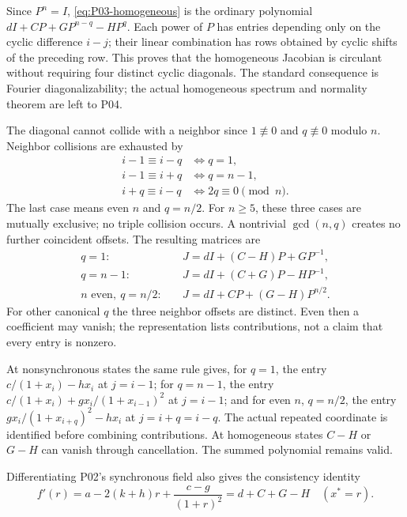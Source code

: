 \documentclass[11pt]{article}
\theoremstyle{definition}
\theoremstyle{remark}
\begin{document}
Since $P^n=I$, \eqref{eq:P03-homogeneous} is the ordinary polynomial
$dI+CP+GP^{n-q}-HP^q$. Each power of $P$ has entries depending
only on the cyclic difference $i-j$; their linear combination has
rows obtained by cyclic shifts of the preceding row. This proves
that the homogeneous Jacobian is circulant without requiring four
distinct cyclic diagonals. The standard consequence is Fourier
 diagonalizability; the actual homogeneous spectrum and normality
 theorem are left to P04.

The diagonal cannot collide with a neighbor since $1\not\equiv0$
and $q\not\equiv0$ modulo $n$. Neighbor collisions are exhausted by
\[
\begin{aligned}
 i-1\equiv i-q&\iff q=1,\\
 i-1\equiv i+q&\iff q=n-1,\\
 i+q\equiv i-q&\iff 2q\equiv0\pmod n.
\end{aligned}
\]
The last case means even $n$ and $q=n/2$. For $n\ge5$, these
three cases are mutually exclusive; no triple collision occurs.
A nontrivial $\gcd(n,q)$ creates no further coincident offsets.
The resulting matrices are
\begin{align}
 q=1:&\quad J=dI+(C-H)P+GP^{-1},
    \label{eq:P03-collision-one}\\
 q=n-1:&\quad J=dI+(C+G)P-HP^{-1},
    \label{eq:P03-collision-last}\\
 n\text{ even},\ q=n/2:&\quad J=dI+CP+(G-H)P^{n/2}.
    \label{eq:P03-collision-half}
\end{align}
For other canonical $q$ the three neighbor offsets are distinct.
Even then a coefficient may vanish; the representation lists
contributions, not a claim that every entry is nonzero.

At nonsynchronous states the same rule gives, for $q=1$, the
entry $c/(1+x_i)-h x_i$ at $j=i-1$; for $q=n-1$, the entry
$c/(1+x_i)+g x_i/(1+x_{i-1})^2$ at $j=i-1$; and for even $n$,
$q=n/2$, the entry $g x_i/(1+x_{i+q})^2-h x_i$ at
$j=i+q=i-q$. The actual repeated coordinate is identified before
combining contributions. At homogeneous states $C-H$ or $G-H$
can vanish through cancellation. The summed polynomial remains valid.

Differentiating P02's synchronous field also gives the consistency identity
\begin{equation}
 f'(r)=a-2(k+h)r+\frac{c-g}{(1+r)^2}
       =d+C+G-H\quad(x^*=r).
 \label{eq:P03-row-sum-check}
\end{equation}


\end{document}

